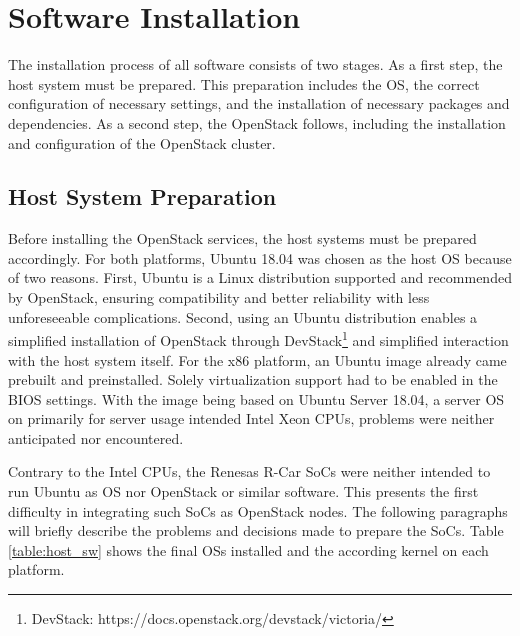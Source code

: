     
    \section{Software Installation}
    \label{section:software_installation}
        
        The installation process of all software consists of two stages.
        As a first step, the host system must be prepared.
        This preparation includes the OS, the correct configuration of necessary settings, and the installation of necessary packages and dependencies.
        As a second step, the OpenStack follows, including the installation and configuration of the OpenStack cluster.
        
        
        \subsection{Host System Preparation}
            
            Before installing the OpenStack services, the host systems must be prepared accordingly.
            For both platforms, Ubuntu 18.04 was chosen as the host \ac{OS} because of two reasons.
            First, Ubuntu is a Linux distribution supported and recommended by OpenStack, ensuring compatibility and better reliability with less unforeseeable complications.
            Second, using an Ubuntu distribution enables a simplified installation of OpenStack through DevStack\footnote{DevStack: https://docs.openstack.org/devstack/victoria/} and simplified interaction with the host system itself.
            For the x86 platform, an Ubuntu image already came prebuilt and preinstalled.
            Solely virtualization support had to be enabled in the BIOS settings.
            With the image being based on Ubuntu Server 18.04, a server \ac{OS} on primarily for server usage intended Intel Xeon \acp{CPU}, problems were neither anticipated nor encountered.
            
            \noindent Contrary to the Intel \acp{CPU}, the Renesas R-Car \acp{SoC} were neither intended to run Ubuntu as \ac{OS} nor OpenStack or similar software.
            This presents the first difficulty in integrating such \acp{SoC} as OpenStack nodes.
            The following paragraphs will briefly describe the problems and decisions made to prepare the \acp{SoC}.
            Table \ref{table:host_sw} shows the final \acp{OS} installed and the according kernel on each platform.
            
